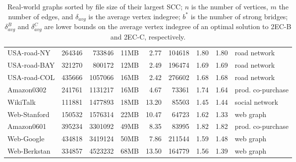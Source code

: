 \documentclass[11pt]{article}
\begin{document}
\begin{table}[!ht]
\begin{adjustbox}{width=\textwidth,totalheight=\textheight,keepaspectratio}
\begin{small}
\begin{tabular}{l|rrrrrrr|l}
USA-road-NY      & 264346     & 733846     & 11MB               & 2.77                    & 104618                  & 1.80                              & 1.80                                                  & road network                      \\
USA-road-BAY     & 321270     & 800172     & 12MB               & 2.49                    & 196474                  & 1.69                              & 1.69                                                  & road network                      \\
USA-road-COL     & 435666     & 1057066    & 16MB               & 2.42                    & 276602                  & 1.68                              & 1.68                                                  & road network                      \\
Amazon0302       & 241761     & 1131217    & 16MB               & 4.67                    & 73361                   & 1.74                              & 1.64                                                  & prod. co-purchase                 \\
WikiTalk         & 111881     & 1477893    & 18MB               & 13.20                   & 85503                   & 1.45                              & 1.44                                                  & social network                    \\
Web-Stanford     & 150532     & 1576314    & 22MB               & 10.47                   & 64723                   & 1.62                              & 1.33                                                  & web graph                         \\
Amazon0601       & 395234     & 3301092    & 49MB               & 8.35                    & 83995                   & 1.82                              & 1.82                                                  & prod. co-purchase                 \\
Web-Google       & 434818     & 3419124    & 50MB               & 7.86                    & 211544                  & 1.59                              & 1.48                                                  & web graph                         \\
Web-Berkstan     & 334857     & 4523232    & 68MB               & 13.50                   & 164779                  & 1.56                              & 1.39                                           & web graph\\
\hline \end{tabular}
 \end{small}
\end{adjustbox}
\caption{Real-world graphs sorted by file size of their largest
SCC; $n$ is the number of vertices, $m$ the number of edges, and
$\delta_{avg}$ is the average vertex indegree; $b^{\ast}$ is the
number of strong bridges; $\delta_{avg}^{B}$ and
$\delta_{avg}^{C}$ are lower bounds on the average vertex indegree
of an optimal solution to \textsf{2EC-B} and \textsf{2EC-C},
respectively.}\label{tab:datasets}
\end{table}
\end{document}
